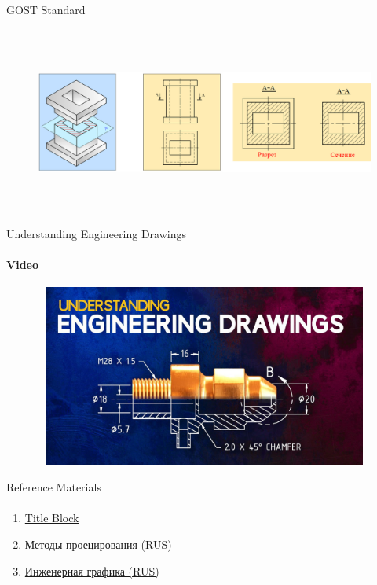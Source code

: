 \documentclass[aspectratio=169]{beamer}
\newcommand{\fbckg}[1]{\usebackgroundtemplate{\texttt{[image: \#1]}}}%
\begin{document}
\begin{frame}[t]{GOST Standard}
    \framesubtitle{}
    \vspace{-0.6cm}
    \begin{figure}[H]
        \centering\includegraphics[height=6cm,width=1\textwidth,keepaspectratio]{resources/st8.png}
        \label{fig:resources/st8.png}
    \end{figure}
\end{frame}

\begin{frame}[t]{Understanding Engineering Drawings}
    \framesubtitle{Video}
    \vspace{-0.6cm}
    \begin{figure}[H]
        \href{https://youtu.be/ht9GwXQMgpo}{
            \centering\includegraphics[height=6cm,width=1\textwidth,keepaspectratio]{resources/drawings_video.jpg}}
        \label{fig:resources/drawings_video.jpg}
    \end{figure}
\end{frame}


\begin{frame}[t]{Reference Materials}
    \framesubtitle{}
    \begin{enumerate}
        \item \href{https://werk24.io/knowledge-base-technical-drawings/title-block}{Title Block}
        \item \href{https://thepresentation.ru/grafika/vvedenie-metody-proetsirovaniya-tochka-proetsirovanie-tochki}{Методы проецирования (RUS)}
        \item \href{https://studfile.net/preview/3366860/page:6/}{Инженерная графика (RUS)}
    \end{enumerate}
\end{frame}


\fbckg{fibeamer/figs/last_page.png}
\frame[plain]{}
\end{document}
